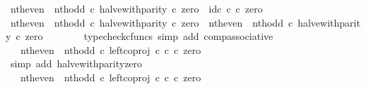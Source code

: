 \begin{isabellebody}
\ {\isachardoublequoteopen}{\isacharparenleft}{\kern0pt}nth{\isacharunderscore}{\kern0pt}even\ {\isasymamalg}\ nth{\isacharunderscore}{\kern0pt}odd\ {\isasymcirc}\isactrlsub c\ halve{\isacharunderscore}{\kern0pt}with{\isacharunderscore}{\kern0pt}parity{\isacharparenright}{\kern0pt}\ {\isasymcirc}\isactrlsub c\ zero\ {\isacharequal}{\kern0pt}\ id\isactrlsub c\ {\isasymnat}\isactrlsub c\ {\isasymcirc}\isactrlsub c\ zero{\isachardoublequoteclose}\isanewline
\ \ \isamarkupfalse%
\ {\isacharminus}{\kern0pt}\isanewline
\ \ \ \ \isamarkupfalse%
\ {\isachardoublequoteopen}{\isacharparenleft}{\kern0pt}nth{\isacharunderscore}{\kern0pt}even\ {\isasymamalg}\ nth{\isacharunderscore}{\kern0pt}odd\ {\isasymcirc}\isactrlsub c\ halve{\isacharunderscore}{\kern0pt}with{\isacharunderscore}{\kern0pt}parity{\isacharparenright}{\kern0pt}\ {\isasymcirc}\isactrlsub c\ zero\ {\isacharequal}{\kern0pt}\ nth{\isacharunderscore}{\kern0pt}even\ {\isasymamalg}\ nth{\isacharunderscore}{\kern0pt}odd\ {\isasymcirc}\isactrlsub c\ halve{\isacharunderscore}{\kern0pt}with{\isacharunderscore}{\kern0pt}parity\ {\isasymcirc}\isactrlsub c\ zero{\isachardoublequoteclose}\isanewline
\ \ \ \ \ \ \isamarkupfalse%
\ {\isacharparenleft}{\kern0pt}typecheck{\isacharunderscore}{\kern0pt}cfuncs{\isacharcomma}{\kern0pt}\ simp\ add{\isacharcolon}{\kern0pt}\ comp{\isacharunderscore}{\kern0pt}associative{}{\isacharparenright}{\kern0pt}\isanewline
\ \ \ \ \isamarkupfalse%
\ \isamarkupfalse%
\ {\isachardoublequoteopen}{\isachardot}{\kern0pt}{\isachardot}{\kern0pt}{\isachardot}{\kern0pt}\ {\isacharequal}{\kern0pt}\ nth{\isacharunderscore}{\kern0pt}even\ {\isasymamalg}\ nth{\isacharunderscore}{\kern0pt}odd\ {\isasymcirc}\isactrlsub c\ left{\isacharunderscore}{\kern0pt}coproj\ {\isasymnat}\isactrlsub c\ {\isasymnat}\isactrlsub c\ {\isasymcirc}\isactrlsub c\ zero{\isachardoublequoteclose}\isanewline
\ \ \ \ \ \ \isamarkupfalse%
\ {\isacharparenleft}{\kern0pt}simp\ add{\isacharcolon}{\kern0pt}\ halve{\isacharunderscore}{\kern0pt}with{\isacharunderscore}{\kern0pt}parity{\isacharunderscore}{\kern0pt}zero{\isacharparenright}{\kern0pt}\isanewline
\ \ \ \ \isamarkupfalse%
\ \isamarkupfalse%
\ {\isachardoublequoteopen}{\isachardot}{\kern0pt}{\isachardot}{\kern0pt}{\isachardot}{\kern0pt}\ {\isacharequal}{\kern0pt}\ {\isacharparenleft}{\kern0pt}nth{\isacharunderscore}{\kern0pt}even\ {\isasymamalg}\ nth{\isacharunderscore}{\kern0pt}odd\ {\isasymcirc}\isactrlsub c\ left{\isacharunderscore}{\kern0pt}coproj\ {\isasymnat}\isactrlsub c\ {\isasymnat}\isactrlsub c{\isacharparenright}{\kern0pt}\ {\isasymcirc}\isactrlsub c\ zero{\isachardoublequoteclose}\isanewline

\end{isabellebody}
